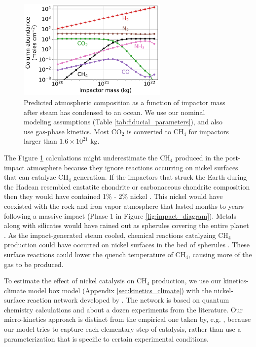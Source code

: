 \begin{figure}
  \centering
  \includegraphics[width=0.65\textwidth]{tex/5impacts/figures/Figure2.pdf}
  \caption{Predicted atmospheric composition as a function of impactor mass after steam has condensed to an ocean. We use our nominal modeling assumptions (Table \ref{tab:fiducial_parameters}), and also use gas-phase kinetics. Most CO$_2$ is converted to CH$_4$ for impactors larger than $1.6 \times 10^{21}$ kg.}
  \label{fig:figure2}
\end{figure}

The Figure \ref{fig:figure2} calculations might underestimate the CH$_4$ produced in the post-impact atmosphere because they ignore reactions occurring on nickel surfaces that can catalyze CH$_4$ generation. If the impactors that struck the Earth during the Hadean resembled enstatite chondrite or carbonaceous chondrite composition then they would have contained 1\% - 2\% nickel \citep[Table 15]{Lewis_1992}. This nickel would have coexisted with the rock and iron vapor atmosphere that lasted months to years following a massive impact (Phase 1 in Figure \ref{fig:impact_diagram}). Metals along with silicates would have rained out as spherules covering the entire planet \citep{Genda_2017}. As the impact-generated steam cooled, chemical reactions catalyzing CH$_4$ production could have occurred on nickel surfaces in the bed of spherules \citep{Schmider_2021}. These surface reactions could lower the quench temperature of CH$_4$, causing more of the gas to be produced.

To estimate the effect of nickel catalysis on CH$_4$ production, we use our kinetics-climate model box model (Appendix \ref{sec:kinetics_climate}) with the nickel-surface reaction network developed by \citet{Schmider_2021}. The network is based on quantum chemistry calculations and about a dozen experiments from the literature. Our micro-kinetics approach is distinct from the empirical one taken by, e.g. \citet{Kress_2004}, because our model tries to capture each elementary step of catalysis, rather than use a parameterization that is specific to certain experimental conditions. 

